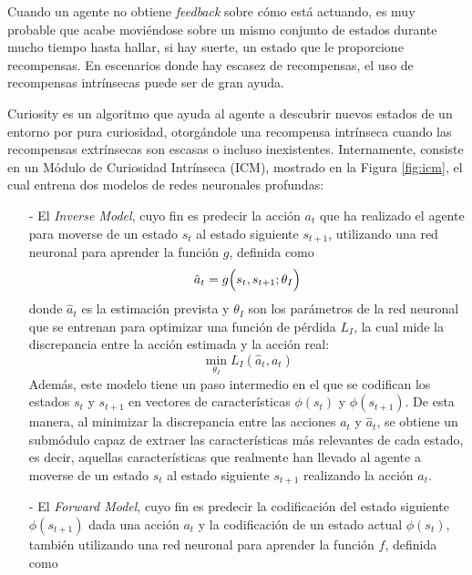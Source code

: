 Cuando un agente no obtiene \emph{feedback} sobre cómo está actuando, es muy probable que acabe moviéndose sobre un mismo conjunto de estados durante mucho tiempo hasta hallar, si hay suerte, un estado que le proporcione recompensas. En escenarios donde hay escasez de recompensas, el uso de recompensas intrínsecas puede ser de gran ayuda.

Curiosity \cite{pathak2017curiosity} es un algoritmo que ayuda al agente a descubrir nuevos estados de un entorno por pura curiosidad, otorgándole una recompensa intrínseca cuando las recompensas extrínsecas son escasas o incluso inexistentes. Internamente, consiste en un Módulo de Curiosidad Intrínseca (ICM), mostrado en la Figura \ref{fig:icm}, el cual entrena dos modelos de redes neuronales profundas:

\begin{enumerate}
    \item[-] El \emph{Inverse Model}, cuyo fin es predecir la acción $a_t$ que ha realizado el agente para moverse de un estado $s_{t}$ al estado siguiente $s_{t+1}$, utilizando una red neuronal para aprender la función $g$, definida como \begin{equation}
        \hat{a}_t = g\Bigl(s_t, s_{t+1};\theta_I\Bigr)
    \end{equation} donde $\hat{a}_t$ es la estimación prevista y $\theta_I$ son los parámetros de la red neuronal que se entrenan para optimizar una función de pérdida $L_I$, la cual mide la discrepancia entre la acción estimada y la acción real:
    \begin{equation}
        \min_{\theta_I} L_I(\hat{a}_t, a_t)
        \label{inverse-loss}
    \end{equation}
    Además, este modelo tiene un paso intermedio en el que se codifican los estados $s_t$ y $s_{t+1}$ en vectores de características $\phi(s_t)$ y $\phi(s_{t+1})$. De esta manera, al minimizar la discrepancia entre las acciones $a_t$ y $\hat{a}_t$, se obtiene un submódulo capaz de extraer las características más relevantes de cada estado, es decir, aquellas características que realmente han llevado al agente a moverse de un estado $s_t$ al estado siguiente $s_{t+1}$ realizando la acción $a_t$.
    \newpage
    \item[-] El \emph{Forward Model}, cuyo fin es predecir la codificación del estado siguiente $\phi(s_{t+1})$ dada una acción $a_t$ y la codificación de un estado actual $\phi(s_t)$, también utilizando una red neuronal para aprender la función $f$, definida como
    \begin{equation}

\end{equation}
\end{enumerate}
